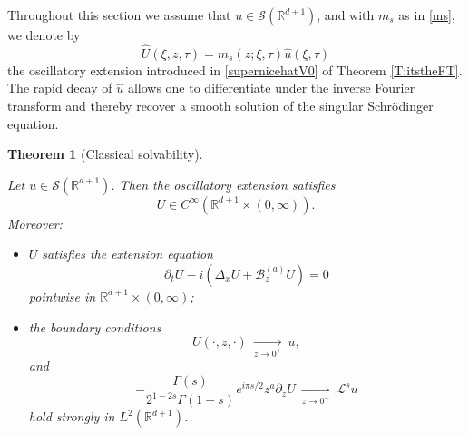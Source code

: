 \documentclass[11pt,letter]{amsart}
\def \RNu {\mathbb{R}^{d+1}}
\newcommand{\Ba}{\mathscr B_z^{(a)}}
\numberwithin{equation}{section}
\newcommand{\Le}{\mathcal L}
\newtheorem{theorem}{Theorem}[section]
\numberwithin{equation}{section}
\begin{document}
Throughout this section we assume that $u\in\mathscr S(\RNu)$,
and with $m_s$ as in \eqref{ms}, we denote by
\[
\widehat U(\xi,z,\tau)
=
m_s(z;\xi,\tau)\widehat u(\xi,\tau)
\]
the oscillatory extension introduced in \eqref{supernicehatV0} of Theorem \ref{T:itstheFT}.
The rapid decay of $\widehat u$ allows one to differentiate under the
inverse Fourier transform and thereby recover a smooth solution of the
singular Schr\"odinger equation.

\begin{theorem}[Classical solvability]
\label{T:classical}

Let $u\in\mathscr S(\RNu)$.
Then the oscillatory extension satisfies
\[
U\in C^\infty(\RNu\times(0,\infty)).
\]
Moreover:
\begin{itemize}

\item[(2)] $U$ satisfies the extension equation
\[
\partial_tU - i(\Delta_x U+\Ba U) = 0
\]
pointwise in $\RNu\times(0,\infty)$;
\item[(3)] the boundary conditions
\[
U(\cdot,z,\cdot)\ 
\underset{z\to 0^+}{\longrightarrow}\ 
u,
\]
and
\[
-
\frac{\Gamma(s)}{2^{1-2s}\Gamma(1-s)}
e^{i\pi s/2}
 z^a\partial_zU\ 
\underset{z\to 0^+}{\longrightarrow}\ 
\Le^s u
\]
hold strongly in
$L^2(\mathbb R^{d+1})$.
\end{itemize}
\end{theorem}
\end{document}
